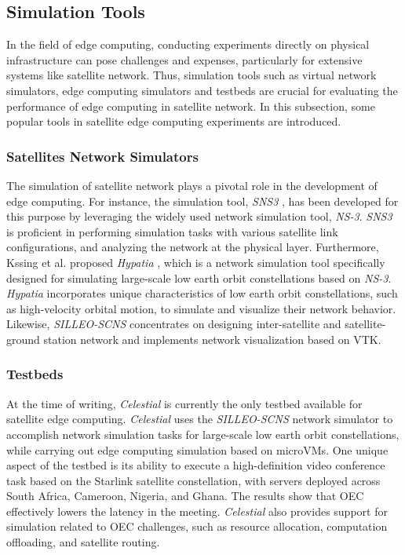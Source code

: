 \documentclass[lettersize,journal]{IEEEtran}
\begin{document}
\subsection{Simulation Tools}
In the field of edge computing, conducting experiments directly on physical infrastructure can pose challenges and expenses, particularly for extensive systems like satellite network. Thus, simulation tools such as virtual network simulators, edge computing simulators and testbeds are crucial for evaluating the performance of edge computing in satellite network. In this subsection,  some popular tools in satellite edge computing experiments are introduced.

\subsubsection*{Satellites Network Simulators} 
The simulation of satellite network plays a pivotal role in the development of edge computing. For instance, the simulation tool, \textit{SNS3} \cite{RN241}, has been developed for this purpose by leveraging the widely used network simulation tool, \textit{NS-3}. \textit{SNS3} is proficient in performing simulation tasks with various satellite link configurations, and analyzing the network at the physical layer. Furthermore, Kssing et al. proposed \textit{Hypatia} \cite{RN242}, which is a network simulation tool specifically designed for simulating large-scale low earth orbit constellations based on \textit{NS-3}. \textit{Hypatia} incorporates unique characteristics of low earth orbit constellations, such as high-velocity orbital motion, to simulate and visualize their network behavior. Likewise, \textit{SILLEO-SCNS} \cite{RN106} concentrates on designing inter-satellite and satellite-ground station network and implements network visualization based on VTK.

\subsubsection*{Testbeds} 
At the time of writing, \textit{Celestial} \cite{RN102} is currently the only testbed available for satellite edge computing. \textit{Celestial} uses the \textit{SILLEO-SCNS} network simulator to accomplish network simulation tasks for large-scale low earth orbit constellations, while carrying out edge computing simulation based on microVMs. One unique aspect of the testbed is its ability to execute a high-definition video conference task based on the Starlink satellite constellation, with servers deployed across South Africa, Cameroon, Nigeria, and Ghana. The results show that OEC effectively lowers the latency in the meeting. \textit{Celestial} also provides support for simulation related to OEC challenges, such as resource allocation, computation offloading, and satellite routing.
\end{document}
